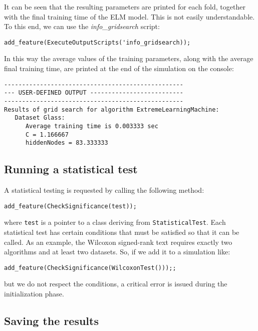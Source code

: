 \noindent It can be seen that the resulting parameters are printed for each fold, together with the final training time of the ELM model. This is not easily understandable. To this end, we can use the \textit{info\_gridsearch} script:

\begin{lstlisting}
add_feature(ExecuteOutputScripts('info_gridsearch));
\end{lstlisting}

\noindent In this way the average values of the training parameters, along with the average final training time, are printed at the end of the simulation on the console:

\begin{small}
\begin{verbatim}
--------------------------------------------------
--- USER-DEFINED OUTPUT --------------------------
--------------------------------------------------
Results of grid search for algorithm ExtremeLearningMachine: 
   Dataset Glass:
      Average training time is 0.003333 sec
      C = 1.166667
      hiddenNodes = 83.333333
\end{verbatim}
\end{small}

\subsection{Running a statistical test}

A statistical testing is requested by calling the following method:

\begin{lstlisting}
add_feature(CheckSignificance(test));
\end{lstlisting}

\noindent where \verb|test| is a pointer to a class deriving from \verb|StatisticalTest|. Each statistical test has certain conditions that must be satisfied so that it can be called. As an example, the Wilcoxon signed-rank text requires exactly two algorithms and at least two datasets. So, if we add it to a simulation like:

\begin{lstlisting}
add_feature(CheckSignificance(WilcoxonTest()));;
\end{lstlisting}

\noindent but we do not respect the conditions, a critical error is issued during the initialization phase.

\subsection{Saving the results}

